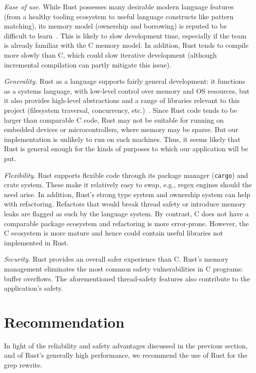 \documentclass[letterpaper,twocolumn,10pt]{article}
\begin{document}
\emph{Ease of use.} While Rust possesses many desirable modern language features (from a healthy tooling ecosystem to useful language constructs like pattern matching), its memory model (ownership and borrowing) is reputed to be difficult to learn~\cite{claude}.
This is likely to slow development time, especially if the team is already familiar with the C memory model.
In addition, Rust tends to compile more slowly than C, which could slow iterative development (although incremental compilation can partly mitigate this issue).

\emph{Generality.} Rust as a language supports fairly general development: it functions as a systems language, with low-level control over memory and OS resources, but it also provides high-level abstractions and a range of libraries relevant to this project (filesystem traversal, concurrency, etc.)~\cite{Klabnik_Nichols_Krycho_2026}.
Since Rust code tends to be larger than comparable C code, Rust may not be suitable for running on embedded devices or microcontrollers, where memory may be sparse.
But our implementation is unlikely to run on such machines.
Thus, it seems likely that Rust is general enough for the kinds of purposes to which our application will be put.

\emph{Flexibility.} Rust supports flexible code through its package manager (\texttt{cargo}) and crate system.
These make it relatively easy to swap, e.g., regex engines should the need arise.
In addition, Rust's strong type system and ownership system can help with refactoring.
Refactors that would break thread safety or introduce memory leaks are flagged as such by the language system.
By contrast, C does not have a comparable package ecosystem and refactoring is more error-prone.
However, the C ecosystem is more mature and hence could contain useful libraries not implemented in Rust.

\emph{Security.} Rust provides an overall safer experience than C.
Rust's memory management eliminates the most common safety vulnerabilities in C programs: buffer overflows.
The aforementioned thread-safety features also contribute to the application's safety.

\section{Recommendation}

In light of the reliability and safety advantages discussed in the previous section, and of Rust's generally high performance, we recommend the use of Rust for the grep rewrite.
\end{document}
